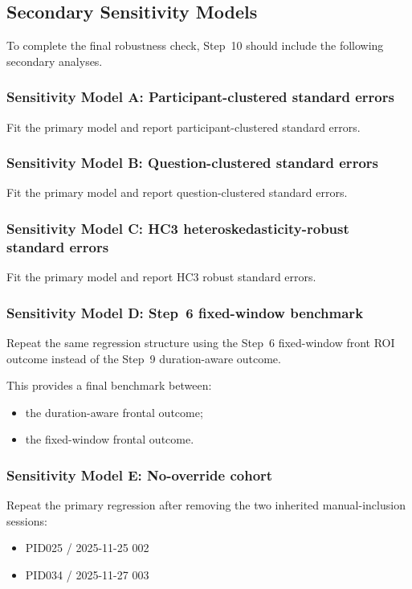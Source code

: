 \subsection{Secondary Sensitivity Models}
To complete the final robustness check, Step~10 should include the following secondary analyses.

\subsubsection{Sensitivity Model A: Participant-clustered standard errors}
Fit the primary model and report participant-clustered standard errors.

\subsubsection{Sensitivity Model B: Question-clustered standard errors}
Fit the primary model and report question-clustered standard errors.

\subsubsection{Sensitivity Model C: HC3 heteroskedasticity-robust standard errors}
Fit the primary model and report HC3 robust standard errors.

\subsubsection{Sensitivity Model D: Step~6 fixed-window benchmark}
Repeat the same regression structure using the Step~6 fixed-window front ROI outcome instead of the
Step~9 duration-aware outcome.

This provides a final benchmark between:
\begin{itemize}
    \item the duration-aware frontal outcome;
    \item the fixed-window frontal outcome.
\end{itemize}

\subsubsection{Sensitivity Model E: No-override cohort}
Repeat the primary regression after removing the two inherited manual-inclusion sessions:
\begin{itemize}
    \item PID025 / 2025-11-25 002
    \item PID034 / 2025-11-27 003
\end{itemize}

